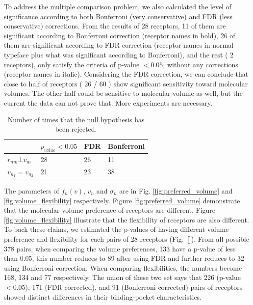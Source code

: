 \documentclass[11pt]{article} %
\newcommand{\numberofreceptors}{ 28 }
\newcommand{\bonferroni}{ 11 }
\newcommand{\fdr}{ 26 }
\newcommand{\nocorrection}{ 2 }
\begin{document}
To address the multiple comparison problem, 
we also calculated the level of significance according to both Bonferroni (very conservative) and FDR (less conservative) corrections. 
From the results of \numberofreceptors receptors, 
\bonferroni of them are significant according to Bonferroni correction (receptor names in bold), 
\fdr of them are significant according to FDR correction 
(receptor names in normal typeface plus what was significant according to Bonferroni), 
and the rest (\nocorrection receptors), 
only satisfy the criteria of  p-value $<0.05$, without any corrections (receptor names in italic).
Considering the FDR correction, 
we can conclude that close to half of receptors (\fdr / 60 ) show significant sensitivity toward molecular volumes. 
The other half could be sensitive to molecular volume as well, but the current the data can not prove that.
More experiments are necessary.
\begin{table}
\begin{center}
    \begin{tabular}{ | l | l | l |l |}
    \hline
     &  $p_{value} < 0.05$ & FDR & Bonferroni \\ \hline
     $r_{nm} \bot v_m$ &  28 &  26 & 11\\ 
     $v_{n_1} = v_{n_2}$&  21 & 23 & 38\\ \hline
    \end{tabular}
\end{center}
\caption{Number of times that the null hypothesis has been rejected.}
\end{table}
The parameters of $f_n(v)$, $v_n$ and $\sigma_n$ are in Fig. \ref{fig:preferred_volume} and \ref{fig:volume_flexibility} respectively.
Figure \ref{fig:preferred_volume} demonstrate that the molecular volume preference of receptors are different. 
Figure \ref{fig:volume_flexibility} illustrate that the flexibility of receptors are also different.
To back these claims, 
we estimated the p-values of having different volume preference and flexibility for each pairs of \numberofreceptors receptors
(Fig.~\ref{}). 
From all possible 378 pairs, 
when comparing the volume preferences, 
133 have a p-value of less than 0.05, 
this number reduces to 89 after using FDR and further reduces to 32 using Bonferroni correction.
When comparing flexibilities, 
the numbers become 168, 134 and 77 respectively. 
The union of these two set says that 226 (p-value $<0.05$), 171 (FDR corrected), and 91 (Bonferroni corrected) pairs of receptors showed distinct differences in their binding-pocket characteristics.
\end{document}
